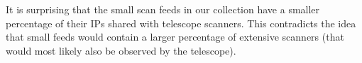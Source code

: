 It is surprising that the small scan feeds in our collection have a smaller percentage of their
IPs shared with telescope scanners. This contradicts the idea that small feeds
would contain a larger percentage of extensive scanners (that would most likely also be observed by the telescope).



